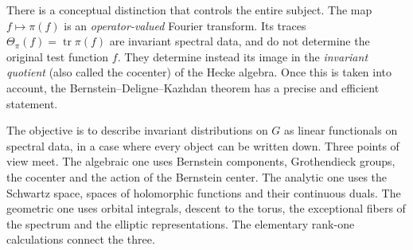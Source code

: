 \documentclass[12pt,letterpaper]{amsart}
\numberwithin{equation}{section}
\theoremstyle{definition}
\theoremstyle{remark}
\newcommand{\tr}{\operatorname{tr}}
\begin{document}
There is a conceptual distinction that controls the entire subject.  The map $f\mapsto\pi(f)$ is an \emph{operator-valued} Fourier transform.  Its traces $\Theta_\pi(f)=\tr\pi(f)$ are invariant spectral data, and do not determine the original test function $f$.  They determine instead its image in the \emph{invariant quotient} (also called the cocenter) of the Hecke algebra.  Once this is taken into account, the Bernstein--Deligne--Kazhdan theorem has a precise and efficient statement.

The objective is to describe invariant distributions on $G$ as linear functionals on spectral data, in a case where every object can be written down. Three points of view meet. The algebraic one uses Bernstein components, Grothendieck groups, the cocenter and the action of the Bernstein center. The analytic one uses the Schwartz space, spaces of holomorphic functions and their continuous duals. The geometric one uses orbital integrals, descent to the torus, the exceptional fibers of the spectrum and the elliptic representations. The elementary rank-one calculations connect the three.
\end{document}
